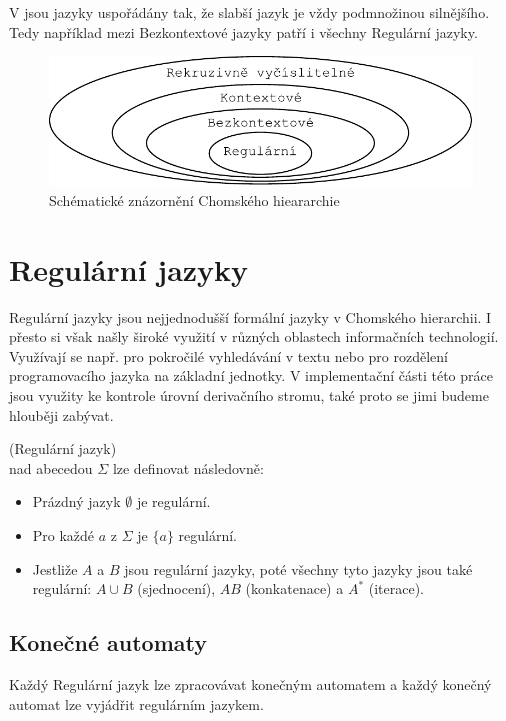 V  jsou jazyky uspořádány tak, že slabší jazyk je
vždy podmnožinou silnějšího. Tedy například mezi Bezkontextové jazyky patří i
všechny Regulární jazyky.\\

\begin{figure}[H]
  \centering
  \includegraphics{fig/Chomsky.pdf}
  \caption{Schématické znázornění Chomského hieararchie}
\end{figure}

\section{Regulární jazyky}
\label{sec:regularLangs}

Regulární jazyky jsou nejjednodušší formální jazyky v Chomského hierarchii.
I přesto si však našly široké využití v různých oblastech informačních technologií.
Využívají se např. pro pokročilé vyhledávání v textu nebo
pro rozdělení programovacího jazyka na základní jednotky.
V implementační části této práce jsou využity ke kontrole úrovní derivačního stromu,
také proto se jimi budeme hlouběji zabývat.

\begin{defn}
  (Regulární jazyk)\\
   nad abecedou $\Sigma$ lze definovat následovně:
  \begin{itemize}
    \item Prázdný jazyk $\emptyset$ je regulární.
    \item Pro každé $a$ z $\Sigma$ je $\{ a \}$ regulární.
    \item Jestliže $A$ a $B$ jsou regulární jazyky, poté všechny tyto jazyky jsou také regulární:
    $A \cup B$ (sjednocení), $AB$ (konkatenace) a $A^*$ (iterace).
  \end{itemize}
\end{defn}

\subsection{Konečné automaty}
Každý Regulární jazyk lze zpracovávat konečným automatem a každý konečný automat
lze vyjádřit regulárním jazykem. \cite{MedunaIFJ}\\


